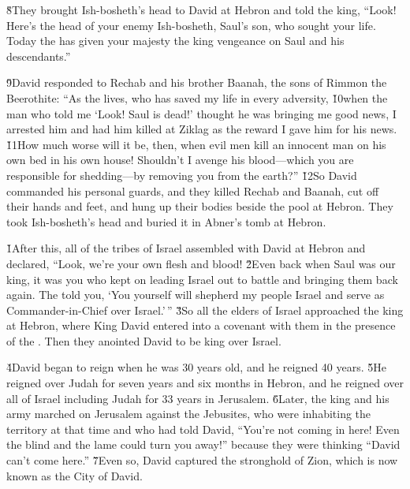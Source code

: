 \v{8}They brought Ish-bosheth's head to David at Hebron and told the king, ``Look! Here's the head of your enemy Ish-bosheth, Saul's son, who sought your life. Today the  has given your majesty the king vengeance on Saul and his descendants.''

\v{9}David responded to Rechab and his brother Baanah, the sons of Rimmon the Beerothite: ``As the  lives, who has saved my life in every adversity, \v{10}when the man who told me `Look! Saul is dead!' thought he was bringing me good news, I arrested him and had him killed at Ziklag as the reward I gave him for his news. \v{11}How much worse will it be, then, when evil men kill an innocent man on his own bed in his own house! Shouldn't I avenge his blood---which you are responsible for shedding---by removing you from the earth?'' \v{12}So David commanded his personal guards, and they killed Rechab and Baanah, cut off their hands and feet, and hung up their bodies beside the pool at Hebron. They took Ish-bosheth's head and buried it in Abner's tomb at Hebron.

\v{1}After this, all of the tribes of Israel assembled with David at Hebron and declared, ``Look, we're your own flesh and blood! \v{2}Even back when Saul was our king, it was you who kept on leading Israel out to battle and bringing them back again. The  told you, `You yourself will shepherd my people Israel and serve as Commander-in-Chief over Israel.'\,'' \v{3}So all the elders of Israel approached the king at Hebron, where King David entered into a covenant with them in the presence of the . Then they anointed David to be king over Israel.

\v{4}David began to reign when he was 30 years old, and he reigned 40 years. \v{5}He reigned over Judah for seven years and six months in Hebron, and he reigned over all of Israel including Judah for 33 years in Jerusalem. \v{6}Later, the king and his army marched on Jerusalem against the Jebusites, who were inhabiting the territory at that time and who had told David, ``You're not coming in here! Even the blind and the lame could turn you away!'' because they were thinking ``David can't come here.'' \v{7}Even so, David captured the stronghold of Zion, which is now known as the City of David.

